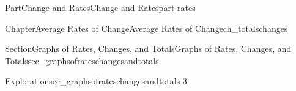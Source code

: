 \documentclass{tufte-book}
\numberwithin{equation}{chapter}
\def \tikzhistogram (#1,#2){\draw[fill=blue,opacity=0.3] ({#1+((\xtwo-\xmin)/5)},#2) rectangle ({#1-((\xtwo-\xmin)/5)},0); \draw[draw,thick] ({#1+((\xtwo-\xmin)/5)},#2) rectangle ({#1-((\xtwo-\xmin)/5)},0); \node[draw,fill=blue, circle,inner sep=2.5pt] at (#1,#2) {};}
\begin{document}
\begin{partptx}{Part}{Change and Rates}{}{Change and Rates}{}{}{part-rates}
\begin{chapterptx}{Chapter}{Average Rates of Change}{}{Average Rates of Change}{}{}{ch_totalschanges}
\begin{sectionptx}{Section}{Graphs of Rates, Changes, and Totals}{}{Graphs of Rates, Changes, and Totals}{}{}{sec_graphsofrateschangesandtotals}
\begin{exploration}{Exploration}{}{sec_graphsofrateschangesandtotals-3}
\begin{enumerate}[font=\bfseries,label=(\alph*),ref=\alph*]
\begin{image}{0.275}{0.45}{0.275}{}
{%
\def \tikzhistogram (#1,#2){\draw[fill=blue,opacity=0.3] ({#1+((\xtwo-\xmin)/5)},#2) rectangle ({#1-((\xtwo-\xmin)/5)},0); \draw[draw,thick] ({#1+((\xtwo-\xmin)/5)},#2) rectangle ({#1-((\xtwo-\xmin)/5)},0); \node[draw,fill=blue, circle,inner sep=2.5pt] at (#1,#2) {};}
\def \xmin {0}
\def \xmax {22}
\def \xtwo {5}
\def \xunits { } 
\def \yunits { }
\def \dyunits { }
\def \yscale {2}
\def \xscale {.2*0.75}
\def \ymin {0}								%
\def \ysecondmajoraxis {1}		%
\def \yfirstminoraxis  {0.5}	%
\def \ysecondminoraxis {1.5}	%
\def \ymax {4}
\def \dymin {-2}
\def \dysecondmajoraxis {-1}
\def \dyfirstminoraxis  {-1.5}
\def \dysecondminoraxis {-0.5}
\def \dymax {2}

}
\end{image}
\end{enumerate}
\end{exploration}
\end{sectionptx}
\end{chapterptx}
\end{partptx}
\end{document}
